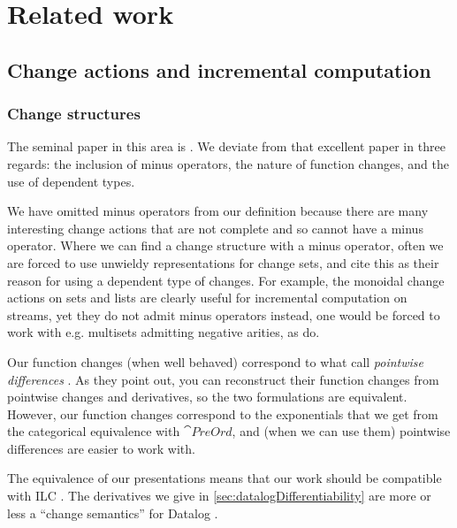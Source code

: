 \section{Related work}

\subsection{Change actions and incremental computation}

\subsubsection{Change structures}
\label{sec:relatedChangeStructures}

The seminal paper in this area is \textcite{cai2014changes}. We deviate from
that excellent paper in three regards: the
inclusion of minus operators, the nature of function changes, and the use of
dependent types.

We have omitted minus operators from our definition because
there are many interesting change actions that are not complete and so cannot
have a minus operator. Where we can find a change structure with a minus operator, often we are
forced to use unwieldy representations for change sets, and
\citeauthor{cai2014changes} cite this as their reason for using a dependent
type of changes. For example, the monoidal change actions on sets and lists are clearly
useful for incremental computation on streams, yet they do not admit minus
operators \textemdash{} instead, one would
be forced to work with e.g. multisets admitting negative arities, as \citeauthor{cai2014changes} do.

Our function changes (when well behaved) correspond to what \citeauthor{cai2014changes} call
\emph{pointwise differences} \autocite[see][section 2.2]{cai2014changes}. As
they point out, you can reconstruct their
function changes from pointwise changes and derivatives, so the two formulations
are equivalent. However, our function changes correspond to the
exponentials that we get from the categorical equivalence with $\cat{PreOrd}$,
and (when we can use them) pointwise differences are easier to work with.

The equivalence of our presentations means that our work should be compatible
with ILC \autocite[see][section 3]{cai2014changes}. The derivatives we give in \cref{sec:datalogDifferentiability} are more or
less a ``change semantics'' for Datalog \autocite[see][section
3.5]{cai2014changes}. 

